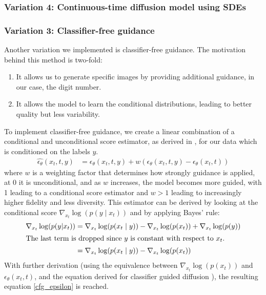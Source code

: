 \subsubsection{Variation 4: Continuous-time diffusion model using SDEs}

\subsubsection{Variation 3: Classifier-free guidance}
Another variation we implemented is classifier-free guidance.
The motivation behind this method is two-fold:
\begin{enumerate}
  \item It allows us to generate specific images by providing additional guidance, in our case, the digit number.
  \item It allows the model to learn the conditional distributions, leading to better quality but less variability.
\end{enumerate}



To implement classifier-free guidance, we create a linear combination of a conditional and unconditional score estimator, as derived in \cite{classifier_free_guidance}, for our data which is conditioned on the labels
$y$.
\begin{align}
  \hat{\epsilon_\theta}(x_t, t, y) &= \epsilon_\theta(x_t, t, y) + w (\epsilon_\theta(x_t, t, y) - \epsilon_\theta(x_t, t))\label{cfg_epsilon}
\end{align}
where $w$ is a weighting factor that determines how strongly guidance is applied, at 0 it is unconditional, and as $w$ increases, the model becomes more guided,
with 1 leading to a conditional score estimator and $w > 1$ leading to increasingly higher fidelity and less diversity.
This estimator can be derived by looking at the conditional score $\nabla_{x_t} \log (p(y \mid x_t))$
and by applying Bayes' rule:
\begin{align}
  \nabla_{x_t} \log (p(y|x_t)) &= \nabla_{x_t} \log (p(x_t \mid y)) - \nabla_{x_t} \log (p(x_t)) + \nabla_{x_t} \log (p(y))\\
  \intertext{The last term is dropped since $y$ is constant with respect to $x_t$.}
  &= \nabla_{x_t} \log (p(x_t \mid y)) - \nabla_{x_t} \log (p(x_t))
\end{align}
With further derivation (using the equivalence between $\nabla_{x_t} \log (p(x_t))$ and $\epsilon_\theta(x_t, t)$, and the equation derived for classifier guided diffusion \cite{classifier_free_guidance}), the resulting equation \ref{cfg_epsilon} is reached. 

